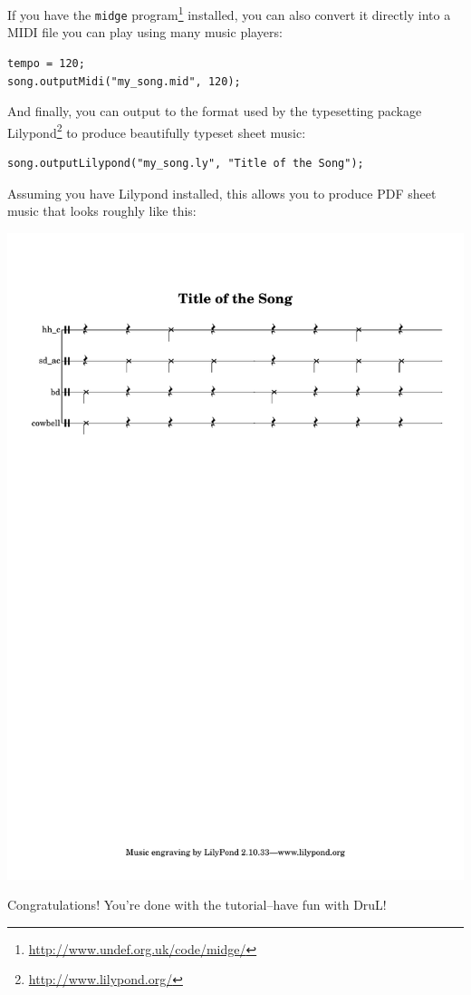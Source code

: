 If you have the {\tt midge} program\footnote{\url{http://www.undef.org.uk/code/midge/}} installed, you can also convert it directly into a MIDI file you can play using many music players:
\begin{lstlisting}
tempo = 120;
song.outputMidi("my_song.mid", 120);
\end{lstlisting}
And finally, you can output to the format used by the typesetting package Lilypond\footnote{\url{http://www.lilypond.org/}}
to produce beautifully typeset  sheet music:
\begin{lstlisting}
song.outputLilypond("my_song.ly", "Title of the Song");
\end{lstlisting}
Assuming you have Lilypond installed, this allows you to produce PDF sheet music that looks roughly like this:

\includegraphics[scale=0.8,trim=1in 7in 0.5in 0.5in]{MYSONG.pdf}

Congratulations!  You're done with the tutorial--have fun with DruL!